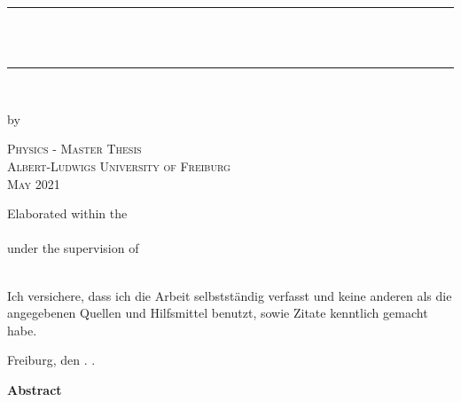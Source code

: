 \newcommand{\HRule}{\rule{\linewidth}{0.2mm}}

\begin{titlepage}	
	\begin{center}

		\HRule \\[0.8cm]
		{ \huge \bfseries \vtitle}\\[0.4cm]
		\HRule \\[0.4cm]

		\vspace{10pt}

		{ \Large by \vauthor }

		\vspace{120pt}
		
		\textsc{\Large Physics - Master Thesis\\[0.5cm] 
			Albert-Ludwigs University of Freiburg\\[0.5cm]
			May 2021\\[0.5cm]}

		\vspace{100pt}	

		\Large{	Elaborated within the\\ 
			\vinstitute\\
			\vspace{15pt}
			under the supervision of \\
 			\vsupervision\\}

	\end{center}
	\vspace{2cm}
\end{titlepage}
\pagebreak



\hspace{2cm}

{\large Ich versichere, dass ich die Arbeit selbstständig verfasst und keine anderen als die 		angegebenen Quellen und Hilfsmittel benutzt, sowie Zitate kenntlich gemacht habe.\par} 
\vspace{1.2cm}
{\large Freiburg, den } \underline{\hspace{0.6cm}} . \underline{\hspace{0.6cm}} . \underline{\hspace{1.2cm}}   \hspace{2.5cm} \underline{\hspace{3.5cm}}
\newpage


\mbox{}
\vspace{10pt}
\begin{center}
	\textbf{Abstract}\qquad
\end{center}
	\presummary



